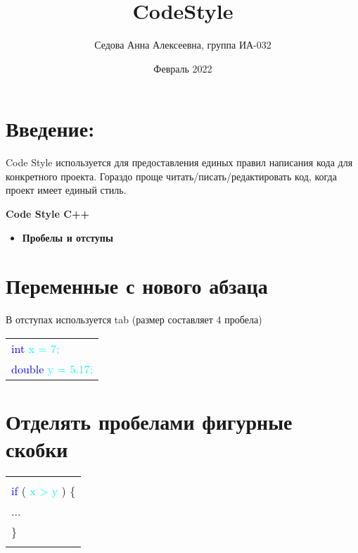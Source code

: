 \documentclass[12pt, letterpaper]{article}
\title{\textbf{CodeStyle}}
\author{Седова Анна Алексеевна, группа ИА-032}
\date{Февраль 2022}
\begin{document}
\maketitle
\newpage
\section{Введение:}
Code Style используется для предоставления единых правил написания кода для конкретного проекта. Гораздо проще читать/писать/редактировать код, когда проект имеет единый стиль.
\\
\begin{center}
    \LARGE\textbf{Code Style C++}\hline
\end{center}

\begin{itemize}
    \item \Large\textbf{Пробелы и отступы}
\end{itemize}
\setcounter{section}{0}
\section{Переменные с нового абзаца}
В отступах используется tab (размер составляет 4 пробела)
\begin{flushleft}
\begin{tabular}{ |l| } 
 \hline
\textcolor{blue}{int} \textcolor{cyan}{x = 7;} \\
\textcolor{blue}{double} \textcolor{cyan}{y = 5.17;} \\
 \hline
\end{tabular}
\end{flushleft}
\section{Отделять пробелами фигурные скобки}
\begin{flushleft}
\begin{tabular}{ |l| } 
 \hline
\\
\textcolor{blue}{if} ( \textcolor{cyan}{x > y}  ) \{ \\
\qquad ... \\
\} \\ 
\\
 \hline
\end{tabular}
\end{flushleft}
\end{document}
